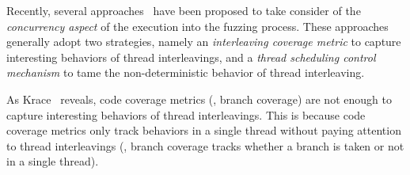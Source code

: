 

Recently, several approaches~\cite{razzer, krace, snowboard, muzz}
have been proposed to take consider of the \textit{concurrency aspect}
of the execution into the fuzzing process.
%
These approaches generally adopt two strategies, namely an
\textit{interleaving coverage metric} to capture interesting behaviors
of thread interleavings, and a \textit{thread scheduling control
  mechanism} to tame the non-deterministic behavior of thread
interleaving.







%
As Krace~\cite{krace} reveals, code coverage metrics (\eg, branch
coverage) are not enough to capture interesting behaviors of thread
interleavings. This is because code coverage metrics only track
behaviors in a single thread without paying attention to thread
interleavings (\eg, branch coverage tracks whether a branch is taken
or not in a single thread).



